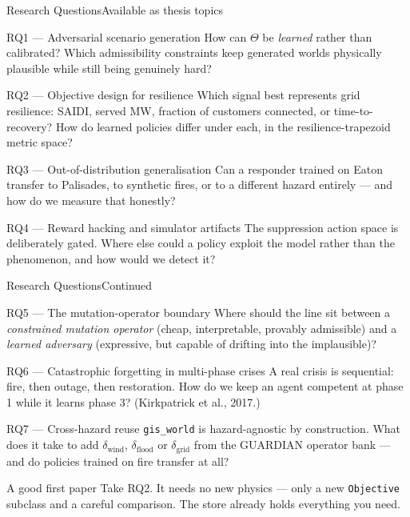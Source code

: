 \documentclass[aspectratio=169,9pt]{beamer}
\newcommand{\code}[1]{{\small\texttt{#1}}}
\begin{document}
\begin{frame}{Research Questions}{Available as thesis topics}
  \small
  \begin{block}{RQ1 --- Adversarial scenario generation}
    How can $\Theta$ be \emph{learned} rather than calibrated? Which
    admissibility constraints keep generated worlds physically plausible
    while still being genuinely hard?
  \end{block}
  \begin{block}{RQ2 --- Objective design for resilience}
    Which signal best represents grid resilience: SAIDI, served MW,
    fraction of customers connected, or time-to-recovery? How do learned
    policies differ under each, in the resilience-trapezoid metric space?
  \end{block}
  \begin{block}{RQ3 --- Out-of-distribution generalisation}
    Can a responder trained on Eaton transfer to Palisades, to synthetic
    fires, or to a different hazard entirely --- and how do we measure that
    honestly?
  \end{block}
  \begin{block}{RQ4 --- Reward hacking and simulator artifacts}
    The suppression action space is deliberately gated. Where else could a
    policy exploit the model rather than the phenomenon, and how would we
    detect it?
  \end{block}
\end{frame}

\begin{frame}{Research Questions}{Continued}
  \small
  \begin{block}{RQ5 --- The mutation-operator boundary}
    Where should the line sit between a \emph{constrained mutation operator}
    (cheap, interpretable, provably admissible) and a \emph{learned
    adversary} (expressive, but capable of drifting into the implausible)?
  \end{block}
  \begin{block}{RQ6 --- Catastrophic forgetting in multi-phase crises}
    A real crisis is sequential: fire, then outage, then restoration. How do
    we keep an agent competent at phase 1 while it learns phase 3?
    (Kirkpatrick et al., 2017.)
  \end{block}
  \begin{block}{RQ7 --- Cross-hazard reuse}
    \code{gis\_world} is hazard-agnostic by construction. What does it take
    to add $\delta_{\text{wind}}$, $\delta_{\text{flood}}$ or
    $\delta_{\text{grid}}$ from the GUARDIAN operator bank --- and do
    policies trained on fire transfer at all?
  \end{block}
  \vskip4pt
  \begin{alertblock}{A good first paper}
    \small Take RQ2. It needs no new physics --- only a new
    \code{Objective} subclass and a careful comparison. The store already
    holds everything you need.
  \end{alertblock}
\end{frame}
\end{document}
